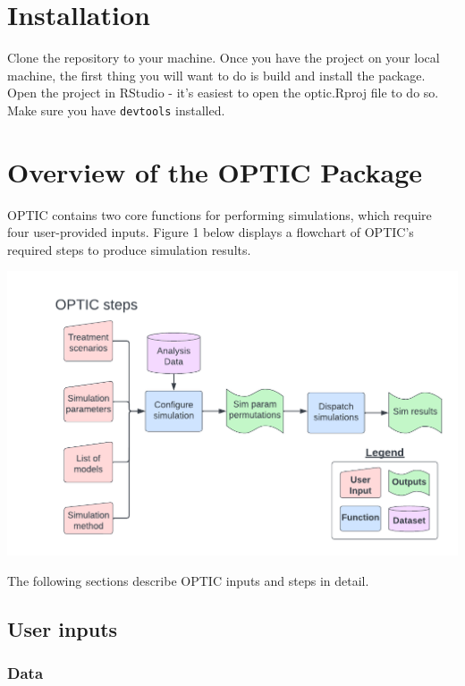 \documentclass[
]{article}
\begin{document}
\hypertarget{installation}{%
\section{Installation}\label{installation}}

Clone the repository to your machine. Once you have the project on your
local machine, the first thing you will want to do is build and install
the package. Open the project in RStudio - it's easiest to open the
optic.Rproj file to do so. Make sure you have \texttt{devtools}
installed.

\hypertarget{overview-of-the-optic-package}{%
\section{Overview of the OPTIC
Package}\label{overview-of-the-optic-package}}

OPTIC contains two core functions for performing simulations, which
require four user-provided inputs. Figure 1 below displays a flowchart
of OPTIC's required steps to produce simulation results.

\includegraphics{optic_flowchart.pdf}

The following sections describe OPTIC inputs and steps in detail.

\hypertarget{user-inputs}{%
\subsection{User inputs}\label{user-inputs}}

\hypertarget{data}{%
\subsubsection{Data}\label{data}}
\end{document}

